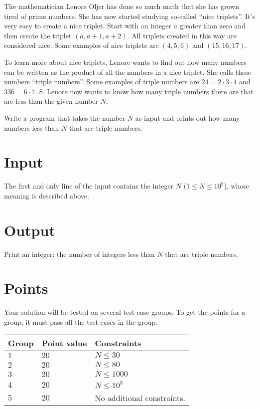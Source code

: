 \noindent

The mathematician Lenore Oljer has done so much math that she has grown tired of prime numbers.
She has now started studying so-called ``nice triplets''. It's very easy to create a nice
triplet. Start with an integer $a$ greater than zero and then create the triplet
$(a, a+1, a+2)$. All triplets created in this way are considered nice. Some examples of
nice triplets are $(4,5,6)$ and $(15,16,17)$.

To learn more about nice triplets, Lenore wants to find out how many numbers can be
written as the product of all the numbers in a nice triplet. She calls these numbers
``triple numbers''. Some examples of triple numbers are $24=2 \cdot 3 \cdot 4$
and $336 = 6 \cdot 7 \cdot 8$. Lenore now wants to know how many triple numbers
there are that are less than the given number $N$.

Write a program that takes the number $N$ as input and prints out how many numbers
less than $N$ that are triple numbers.

\section*{Input}
The first and only line of the input contains the integer $N$ ($1 \le N \le 10^9$),
whose meaning is described above.

\section*{Output}
Print an integer: the number of integers less than $N$ that are triple numbers. 

\section*{Points}
Your solution will be tested on several test case groups.
To get the points for a group, it must pass all the test cases in the group.

\noindent
\begin{tabular}{| l | l | p{12cm} |}
  \hline
  \textbf{Group} & \textbf{Point value} & \textbf{Constraints} \\ \hline
  $1$    & $20$       & $N \leq 30$ \\ \hline
  $2$    & $20$       & $N \leq 80$ \\ \hline
  $3$    & $20$       & $N \leq 1000$ \\ \hline
  $4$    & $20$       & $N \leq 10^5$ \\ \hline
  $5$    & $20$       & No additional constraints. \\ \hline
\end{tabular}
